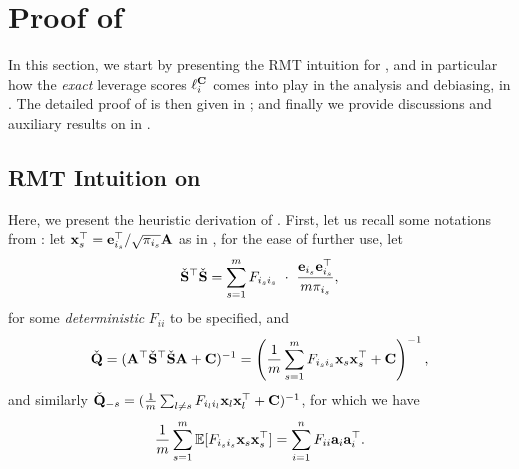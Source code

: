 \documentclass[11pt,a4paper]{article}
\begin{document}
\section{Proof of } 
\label{sec:proof_prop_debias}

In this section, we start by presenting the RMT intuition for , and in particular how the \emph{exact} leverage scores $\ell_i^{\mathbf{C}}$ comes into play in the analysis and debiasing, in .
The detailed proof of  is then given in ; and finally 
we provide discussions and auxiliary results on  in .


\subsection{RMT Intuition on }
\label{subsec:RMT_intuition_prop:debias}

Here, we present the heuristic derivation of .
First, let us recall some notations from :
let $\mathbf{x}^\top_s=\mathbf{e}^\top_{i_s}/\sqrt{\pi_{i_s}}\mathbf{A}$ as in , 
for the ease of further use, let
\begin{align}  
  \check{\mathbf{S}}^\top \check{\mathbf{S}}=\sum^m_{s=1}F_{i_si_s}~\cdot~\frac{\mathbf{e}_{i_s}\mathbf{e}^\top_{i_s} }{m\pi_{i_s}},\nonumber
\end{align} 
for some \emph{deterministic} $F_{ii}$ to be specified, and
\begin{equation*}
  \check{\mathbf{Q}}=(\mathbf{A}^\top \check{\mathbf{S}}^\top \check{\mathbf{S}} \mathbf{A} +\mathbf{C})^{-1}= \left(\frac{1}{m} \sum^{m}_{s=1} F_{i_si_s} \mathbf{x}_s{\mathbf{x}}^{\top}_s + \mathbf{C} \right)^{-1},
\end{equation*}
and similarly $\check{\mathbf{Q}}_{-s}=( \frac1m \sum_{l\neq s} F_{i_li_l}\mathbf{x}_l\mathbf{x}_l^\top+\mathbf{C})^{-1}$, for which we have
\begin{equation*}
  \frac{1}{m} \sum^{m}_{s=1} {\mathbb{E}}[F_{i_si_s}\mathbf{x}_s{\mathbf{x}}^{\top}_s]=\sum^n_{i=1}  F_{ii}{\mathbf{a}}_i{\mathbf{a}}_i^\top.
\end{equation*}
\end{document}
